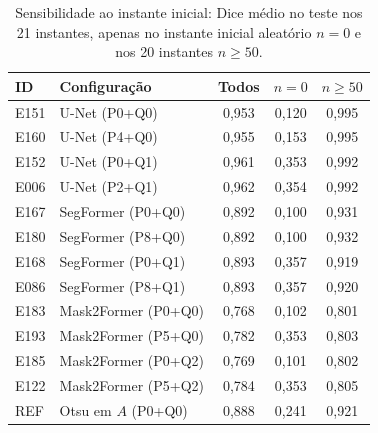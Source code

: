 \begin{table}[t]
\centering
\caption{Sensibilidade ao instante inicial: Dice médio no teste nos 21 instantes, apenas no instante inicial aleatório $n=0$ e nos 20 instantes $n\geq50$.}
\label{tab:sensitivity}
\scriptsize
\setlength{\tabcolsep}{3pt}
\begin{tabularx}{\columnwidth}{L{0.7cm} Y c c c}
\toprule
\textbf{ID} & \textbf{Configuração} & \textbf{Todos} & \textbf{$n=0$} & \textbf{$n\geq50$} \\
\midrule
E151 & U-Net (P0+Q0) & 0,953 & 0,120 & 0,995 \\
E160 & U-Net (P4+Q0) & 0,955 & 0,153 & 0,995 \\
E152 & U-Net (P0+Q1) & 0,961 & 0,353 & 0,992 \\
E006 & U-Net (P2+Q1) & 0,962 & 0,354 & 0,992 \\
\addlinespace
E167 & SegFormer (P0+Q0) & 0,892 & 0,100 & 0,931 \\
E180 & SegFormer (P8+Q0) & 0,892 & 0,100 & 0,932 \\
E168 & SegFormer (P0+Q1) & 0,893 & 0,357 & 0,919 \\
E086 & SegFormer (P8+Q1) & 0,893 & 0,357 & 0,920 \\
\addlinespace
E183 & Mask2Former (P0+Q0) & 0,768 & 0,102 & 0,801 \\
E193 & Mask2Former (P5+Q0) & 0,782 & 0,353 & 0,803 \\
E185 & Mask2Former (P0+Q2) & 0,769 & 0,101 & 0,802 \\
E122 & Mask2Former (P5+Q2) & 0,784 & 0,353 & 0,805 \\
\addlinespace
REF & Otsu em $A$ (P0+Q0) & 0,888 & 0,241 & 0,921 \\
\bottomrule
\end{tabularx}
\end{table}
